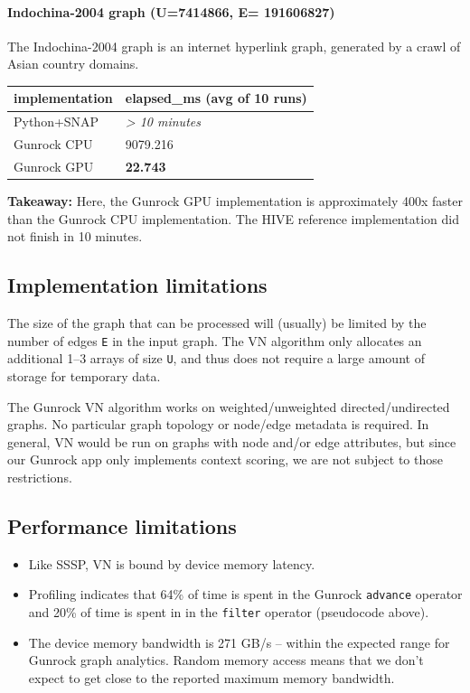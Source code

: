 \documentclass[10pt,oneside]{memoir}
\providecommand{\tightlist}{%
  \setlength{\itemsep}{0pt}\setlength{\parskip}{0pt}}
\let\oldparagraph\paragraph
\renewcommand{\paragraph}[1]{\oldparagraph{#1}\mbox{}}
\begin{document}
\hypertarget{indochina-2004-graph-u7414866-e-191606827}{%
\paragraph{Indochina-2004 graph (\textbar{}U\textbar{}=7414866,
\textbar{}E\textbar{}=
191606827)}\label{indochina-2004-graph-u7414866-e-191606827}}

The Indochina-2004 graph is an internet hyperlink graph, generated by a
crawl of Asian country domains.

\begin{longtable}[]{@{}ll@{}}
\toprule
implementation & elapsed\_ms (avg of 10 runs)\tabularnewline
\midrule
\endhead
Python+SNAP & \emph{\textgreater{} 10 minutes}\tabularnewline
Gunrock CPU & 9079.216\tabularnewline
Gunrock GPU & \textbf{22.743}\tabularnewline
\bottomrule
\end{longtable}

\textbf{Takeaway:} Here, the Gunrock GPU implementation is approximately
400x faster than the Gunrock CPU implementation. The HIVE reference
implementation did not finish in 10 minutes.

\hypertarget{implementation-limitations-9}{%
\subsection{Implementation
limitations}\label{implementation-limitations-9}}

The size of the graph that can be processed will (usually) be limited by
the number of edges \texttt{\textbar{}E\textbar{}} in the input graph.
The VN algorithm only allocates an additional 1--3 arrays of size
\texttt{\textbar{}U\textbar{}}, and thus does not require a large amount
of storage for temporary data.

The Gunrock VN algorithm works on weighted/unweighted
directed/undirected graphs. No particular graph topology or node/edge
metadata is required. In general, VN would be run on graphs with node
and/or edge attributes, but since our Gunrock app only implements
context scoring, we are not subject to those restrictions.

\hypertarget{performance-limitations-8}{%
\subsection{Performance limitations}\label{performance-limitations-8}}

\begin{itemize}
\tightlist
\item
  Like SSSP, VN is bound by device memory latency.
\item
  Profiling indicates that 64\% of time is spent in the Gunrock
  \texttt{advance} operator and 20\% of time is spent in in the
  \texttt{filter} operator (pseudocode above).
\item
  The device memory bandwidth is 271 GB/s -- within the expected range
  for Gunrock graph analytics. Random memory access means that we don't
  expect to get close to the reported maximum memory bandwidth.
\end{itemize}
\end{document}
